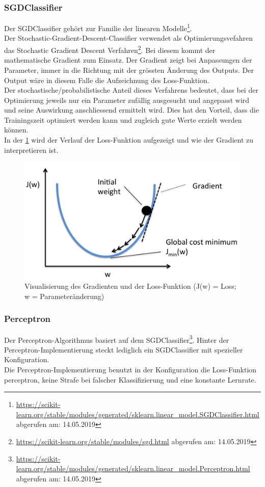 \subsubsection{SGDClassifier}
Der SGDClassifier gehört zur Familie der linearen Modelle\footnote{\url{https://scikit-learn.org/stable/modules/generated/sklearn.linear_model.SGDClassifier.html} abgerufen am: 14.05.2019}\cite{scikit-learn}.\\
Der \glqq Stochastic-Gradient-Descent-Classifier\grqq{} verwendet als Optimierungsvefahren das \glqq Stochastic Gradient Descent\grqq{} Verfahren\footnote{\url{https://scikit-learn.org/stable/modules/sgd.html} abgerufen am: 14.05.2019}.
Bei diesem kommt der mathematische Gradient zum Einsatz.
Der Gradient zeigt bei Anpassungen der Parameter, immer in die Richtung mit der grössten Änderung des Outputs.
Der Output wäre in diesem Falle die Aufzeichnung des Loss-Funktion.\\
Der stochastische/probabilistische Anteil dieses Verfahrens bedeutet, dass bei der Optimierung jeweils nur ein Parameter zufällig ausgesucht und angepasst wird und seine Auswirkung anschliessend ermittelt wird.
Dies hat den Vorteil, dass die Trainingszeit optimiert werden kann und zugleich gute Werte erzielt werden können\cite{lecun2012efficient}.\\
In der \cref{fig:sgd} wird der Verlauf der Loss-Funktion aufgezeigt und wie der Gradient zu interpretieren ist.
\begin{figure}[H]	
	\includegraphics[width=0.7\columnwidth,keepaspectratio]{img/sgd.png}
	\caption{Visualisierung des Gradienten und der Loss-Funktion (J(w) = Loss; w = Parameteränderung)}
	\label{fig:sgd}
\end{figure}
\subsubsection{Perceptron}
Der Perceptron-Algorithmus basiert auf dem SGDClassifier\footnote{\url{https://scikit-learn.org/stable/modules/generated/sklearn.linear_model.Perceptron.html} abgerufen am: 14.05.2019}.
Hinter der Perceptron-Implementierung steckt lediglich ein SGDClassifier mit spezieller Konfiguration.\\
Die Perceptron-Implementierung benutzt in der Konfiguration die Loss-Funktion \glqq perceptron\grqq{}, keine Strafe bei falscher Klassifizierung und eine konstante Lernrate\cite{scikit-learn}.
